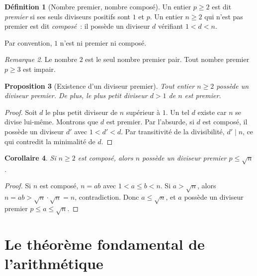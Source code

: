 \documentclass[12pt,a4paper,openany]{book}
\theoremstyle{definition}
\newtheorem{definition}{Définition}[chapter]
\theoremstyle{plain}
\newtheorem{proposition}[definition]{Proposition}
\newtheorem{corollaire}[definition]{Corollaire}
\theoremstyle{remark}
\newtheorem{remarque}[definition]{Remarque}
\begin{document}
\begin{definition}[Nombre premier, nombre composé]
\label{def:premier}
Un entier $p \geq 2$ est dit \emph{premier} si ses seuls diviseurs positifs sont $1$
et $p$. Un entier $n \geq 2$ qui n'est pas premier est dit \emph{composé}~: il
possède un diviseur $d$ vérifiant $1 < d < n$.

Par convention, $1$ n'est ni premier ni composé.
\end{definition}

\begin{remarque}
\label{rem:premier:2}
Le nombre $2$ est le seul nombre premier pair. Tout nombre
premier $p \geq 3$ est impair.
\end{remarque}

\begin{proposition}[Existence d'un diviseur premier]
\label{prop:diviseur_premier}
Tout entier $n \geq 2$ possède un diviseur premier. De plus, le plus petit diviseur
$d > 1$ de $n$ est premier.
\end{proposition}

\begin{proof}
Soit $d$ le plus petit diviseur de $n$ supérieur à $1$. Un tel $d$ existe car $n$
se divise lui-même. Montrons que $d$ est premier. Par l'absurde, si $d$ est composé,
il possède un diviseur $d'$ avec $1 < d' < d$. Par transitivité de la divisibilité,
$d' \mid n$, ce qui contredit la minimalité de $d$.
\end{proof}

\begin{corollaire}
\label{cor:diviseur_premier_sqrt}
Si $n \geq 2$ est composé, alors $n$ possède un diviseur premier $p \leq \sqrt{n}$.
\end{corollaire}

\begin{proof}
Si $n$ est composé, $n = ab$ avec $1 < a \leq b < n$. Si $a > \sqrt{n}$, alors
$n = ab > \sqrt{n} \cdot \sqrt{n} = n$, contradiction. Donc $a \leq \sqrt{n}$, et
$a$ possède un diviseur premier $p \leq a \leq \sqrt{n}$.
\end{proof}

\section{Le théorème fondamental de l'arithmétique}
\label{sec:ch2:fta}
\end{document}
